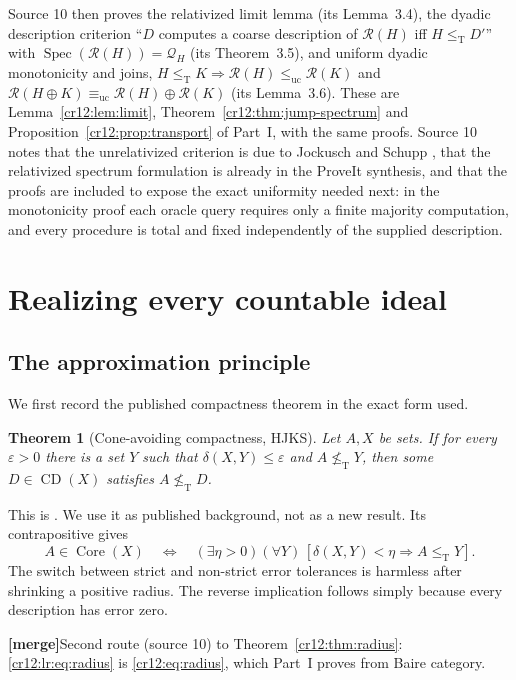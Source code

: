 \documentclass[11pt,letterpaper]{article}
\theoremstyle{plain}
\newtheorem{theorem}{Theorem}[section]
\theoremstyle{definition}
\theoremstyle{remark}
\numberwithin{equation}{section}
\newcommand{\leT}{\leq_{\mathrm T}}
\newcommand{\nleT}{\nleq_{\mathrm T}}
\newcommand{\leuc}{\leq_{\mathrm{uc}}}
\newcommand{\equc}{\equiv_{\mathrm{uc}}}
\newcommand{\Core}{\operatorname{Core}}
\newcommand{\CD}{\operatorname{CD}}
\newcommand{\Spec}{\operatorname{Spec}}
\newcommand{\Rcode}{\mathcal R}
\newcommand{\mergenote}[1]{\par\smallskip\noindent
 {\small\textsf{\textbf{[merge]}}\enspace #1}\par\smallskip}
\begin{document}
Source 10 then proves the relativized limit lemma (its Lemma~3.4), the dyadic
description criterion ``$D$ computes a coarse description of $\Rcode(H)$ iff
$H\leT D'$'' with $\Spec(\Rcode(H))=\mathcal Q_H$ (its Theorem~3.5), and uniform dyadic
monotonicity and joins, $H\leT K\Rightarrow\Rcode(H)\leuc\Rcode(K)$ and
$\Rcode(H\oplus K)\equc\Rcode(H)\oplus\Rcode(K)$ (its Lemma~3.6). These are
Lemma~\ref{cr12:lem:limit}, Theorem~\ref{cr12:thm:jump-spectrum} and
Proposition~\ref{cr12:prop:transport} of Part~I, with the same proofs. Source 10 notes
that the unrelativized criterion is due to Jockusch and Schupp
\cite[Theorem~2.19]{JS}, that the relativized spectrum formulation is already in the
ProveIt synthesis, and that the proofs are included to expose the exact uniformity
needed next: in the monotonicity proof each oracle query requires only a finite
majority computation, and every procedure is total and fixed independently of the
supplied description.

\section{Realizing every countable ideal}\label{cr12:lr:sec:realization}
\subsection{The approximation principle}
We first record the published compactness theorem in the exact form used.
\begin{theorem}[Cone-avoiding compactness, HJKS]\label{cr12:lr:thm:compactness}
Let $A,X$ be sets. If for every $\varepsilon>0$ there is a set $Y$ such that
$\delta(X,Y)\leq\varepsilon$ and $A\nleT Y$, then some $D\in\CD(X)$ satisfies
$A\nleT D$.
\end{theorem}
This is \cite[Theorem~3.7]{HJKS}. We use it as published background, not as a new
result. Its contrapositive gives
\begin{equation}\label{cr12:lr:eq:radius}
 A\in\Core(X)\quad\Longleftrightarrow\quad
 (\exists\eta>0)(\forall Y)\,[\delta(X,Y)<\eta\Longrightarrow A\leT Y].
\end{equation}
The switch between strict and non-strict error tolerances is harmless after shrinking
a positive radius. The reverse implication follows simply because every description
has error zero.

\mergenote{Second route (source 10) to Theorem~\ref{cr12:thm:radius}:
\eqref{cr12:lr:eq:radius} is \eqref{cr12:eq:radius}, which Part~I proves from Baire
category.}
\end{document}
